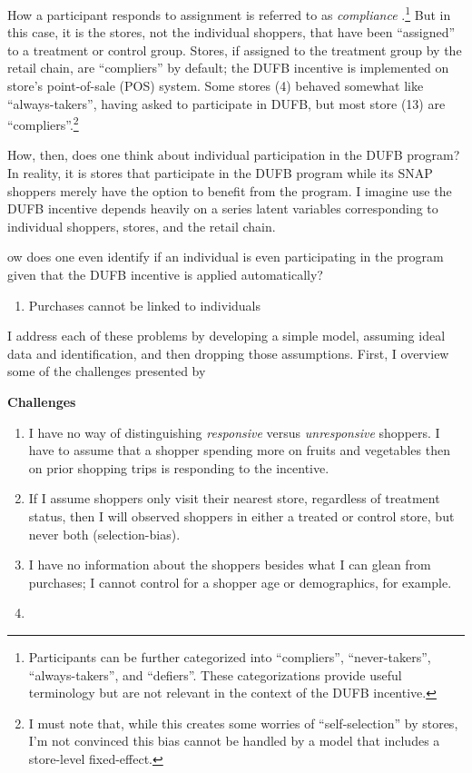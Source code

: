 \documentclass[12pt,letterpaperpaper,]{book}
\providecommand{\tightlist}{%
  \setlength{\itemsep}{0pt}\setlength{\parskip}{0pt}}
\begin{document}
How a participant responds to assignment is referred to as
\emph{compliance} \citep{angrist_mostly_2008}.\footnote{Participants can
  be further categorized into ``compliers'', ``never-takers'',
  ``always-takers'', and ``defiers''. These categorizations provide
  useful terminology but are not relevant in the context of the DUFB
  incentive.} But in this case, it is the stores, not the individual
shoppers, that have been ``assigned'' to a treatment or control group.
Stores, if assigned to the treatment group by the retail chain, are
``compliers'' by default; the DUFB incentive is implemented on store's
point-of-sale (POS) system. Some stores (4) behaved somewhat like
``always-takers'', having asked to participate in DUFB, but most store
(13) are ``compliers''.\footnote{I must note that, while this creates
  some worries of ``self-selection'' by stores, I'm not convinced this
  bias cannot be handled by a model that includes a store-level
  fixed-effect.}

How, then, does one think about individual participation in the DUFB
program? In reality, it is stores that participate in the DUFB program
while its SNAP shoppers merely have the option to benefit from the
program. I imagine use the DUFB incentive depends heavily on a series
latent variables corresponding to individual shoppers, stores, and the
retail chain.

ow does one even identify if an individual is even participating in the
program given that the DUFB incentive is applied automatically?

\begin{enumerate}
\def\labelenumi{\arabic{enumi}.}
\setcounter{enumi}{1}
\tightlist
\item
  Purchases cannot be linked to individuals
\end{enumerate}

I address each of these problems by developing a simple model, assuming
ideal data and identification, and then dropping those assumptions.
First, I overview some of the challenges presented by

\textbf{Challenges}

\begin{enumerate}
\def\labelenumi{\arabic{enumi}.}
\item
  I have no way of distinguishing \emph{responsive} versus
  \emph{unresponsive} shoppers. I have to assume that a shopper spending
  more on fruits and vegetables then on prior shopping trips is
  responding to the incentive.
\item
  If I assume shoppers only visit their nearest store, regardless of
  treatment status, then I will observed shoppers in either a treated or
  control store, but never both (selection-bias).
\item
  I have no information about the shoppers besides what I can glean from
  purchases; I cannot control for a shopper age or demographics, for
  example.
\item
\end{enumerate}
\end{document}
